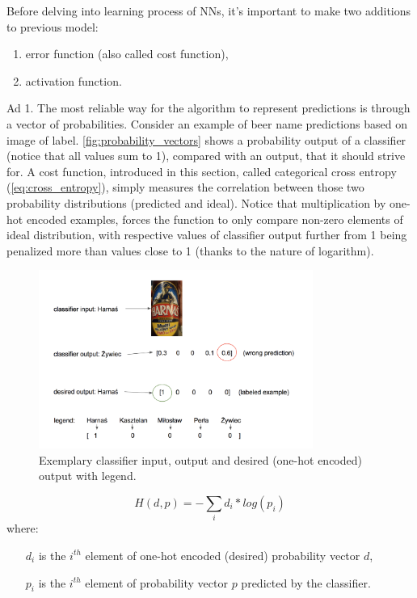 \documentclass[11pt]{article}
\begin{document}
Before delving into learning process of NNs, it's important to make two additions to previous model:
\begin{enumerate}[1)]
\item error function (also called cost function),
\item activation function.
\end{enumerate}
Ad 1. The most reliable way for the algorithm to represent predictions is through a vector of probabilities. Consider an example of beer name predictions based on image of label. \autoref{fig:probability_vectors} shows a probability output of a classifier (notice that all values sum to 1), compared with an output, that it should strive for. A cost function, introduced in this section, called categorical cross entropy (\autoref{eq:cross_entropy}), simply measures the correlation between those two probability distributions (predicted and ideal). Notice that multiplication by one-hot encoded examples, forces the function to only compare non-zero elements of ideal distribution, with respective values of classifier output further from 1 being penalized more than values close to 1 (thanks to the nature of logarithm).\\ 

\begin{figure}[h]
\includegraphics[width=0.8\textwidth]{probability_vectors}
\centering
\caption{Exemplary classifier input, output and desired (one-hot encoded) output with legend.}
\label{fig:probability_vectors}
\end{figure}

\begin{equation} \label{eq:cross_entropy}
H(d, p) = -\sum_i d_i * log(p_i)
\end{equation}
where:
\begin{itemize}
\item[$d_i$] is the $i^{th}$ element of one-hot encoded (desired) probability vector $d$,
\item[$p_i$] is the $i^{th}$ element of probability vector $p$ predicted by the classifier.
\end{itemize}
\end{document}
